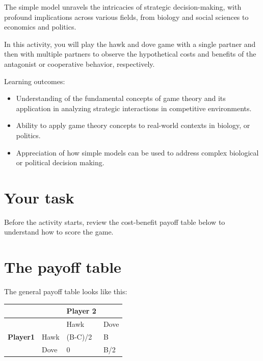 \documentclass[
  a4paper]{book}
\providecommand{\tightlist}{%
  \setlength{\itemsep}{0pt}\setlength{\parskip}{0pt}}
\begin{document}
The simple model unravels the intricacies of strategic decision-making, with profound implications across various fields, from biology and social sciences to economics and politics.

In this activity, you will play the hawk and dove game with a single partner and then with multiple partners to observe the hypothetical costs and benefits of the antagonist or cooperative behavior, respectively.

\begin{do-something}
Learning outcomes:

\begin{itemize}
\tightlist
\item
  Understanding of the fundamental concepts of game theory and its
  application in analyzing strategic interactions in competitive
  environments.
\item
  Ability to apply game theory concepts to real-world contexts in
  biology, or politics.
\item
  Appreciation of how simple models can be used to address complex
  biological or political decision making.
\end{itemize}
\end{do-something}

\hypertarget{your-task-14}{%
\section{Your task}\label{your-task-14}}

Before the activity starts, review the cost-benefit payoff table below to understand how to score the game.

\hypertarget{the-payoff-table}{%
\section{The payoff table}\label{the-payoff-table}}

The general payoff table looks like this:

\begin{longtable}[]{@{}llll@{}}
\toprule\noalign{}
& & Player 2 & \\
\midrule\noalign{}
\endhead
\bottomrule\noalign{}
\endlastfoot
& & Hawk & Dove \\
\textbf{Player1} & Hawk & (B-C)/2 & B \\
& Dove & 0 & B/2 \\
\end{longtable}
\end{document}
